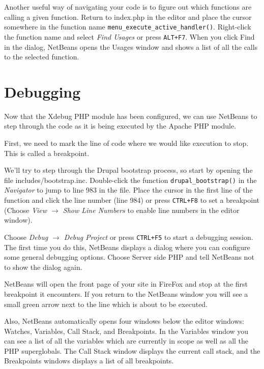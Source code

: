 \documentclass[ebook,10pt,twoside,openright]{memoir}
\begin{document}
Another useful way of navigating your code is to figure out which functions are calling a given function. Return to index.php in the editor and place the cursor somewhere in the function name \verb!menu_execute_active_handler()!. Right-click the function name and select \emph{Find Usages} or press \verb!ALT+F7!. When you click Find in the dialog, NetBeans opens the Usages window and shows a list of all the calls to the selected function.


\section{Debugging}

Now that the Xdebug PHP module has been configured, we can use NetBeans to step through the code as it is being executed by the Apache PHP module.

First, we need to mark the line of code where we would like execution to stop. This is called a breakpoint.

We’ll try to step through the Drupal bootstrap process, so start by opening the file includes/bootstrap.inc. Double-click the function \verb!drupal_bootstrap()! in the \emph{Navigator} to jump to line 983 in the file. Place the cursor in the first line of the function and click the line number (line 984) or press \verb!CTRL+F8! to set a breakpoint (Choose \emph{View $\rightarrow$ Show Line Numbers} to enable line numbers in the editor window).

Choose \emph{Debug $\rightarrow$ Debug Project} or press \verb!CTRL+F5! to start a debugging session. The first time you do this, NetBeans displays a dialog where you can configure some general debugging options. Choose Server side PHP and tell NetBeans not to show the dialog again.

NetBeans will open the front page of your site in FireFox and stop at the first breakpoint it encounters. If you return to the NetBeans window you will see a small green arrow next to the line which is about to be executed.

Also, NetBeans automatically opens four windows below the editor windows: Watches, Variables, Call Stack, and Breakpoints. In the Variables window you can see a list of all the variables which are currently in scope as well as all the PHP superglobals. The Call Stack window displays the current call stack, and the Breakpoints windows displays a list of all breakpoints.
\end{document}
